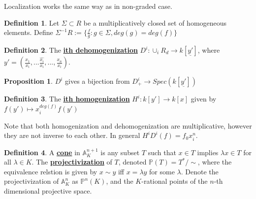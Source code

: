 \documentclass{article}
\theoremstyle{definition}
\theoremstyle{definition}
\newtheorem{definition}{Definition}[theorem]
\theoremstyle{definition}
\theoremstyle{definition}
\newtheorem{proposition}{Proposition}[theorem]
\theoremstyle{definition}
\theoremstyle{definition}
\theoremstyle{definition}
\begin{document}
Localization works the same way as in non-graded case. 

\begin{tcolorbox}[colback=purple!5!white,colframe=purple!75!black]
\begin{definition}
Let $\Sigma\subset R$ be a multiplicatively closed set of homogeneous elements. Define $\Sigma^{-1}R:=\{\frac{f}{g}: g\in \Sigma, deg(g)=deg(f)\}$
\end{definition}
\end{tcolorbox}


\begin{tcolorbox}[colback=purple!5!white,colframe=purple!75!black]
\begin{definition}
The \underline{\textbf{ith dehomogenization}} $D^i: \cup_i R_d\to k[\underline{y'}]$, where $y'=(\frac{x_1}{x_i},...\frac{\hat{x_i}}{x_i},...,\frac{x_n}{x_i})$.
\end{definition}
\end{tcolorbox}


\begin{tcolorbox}[colback=blue!5!white,colframe=blue!30!white]
\begin{proposition}
$D^i$ gives a bijection from $D^i_+ \to Spec(k[\underline{y'}]) $
\end{proposition}
\end{tcolorbox}


\begin{tcolorbox}[colback=purple!5!white,colframe=purple!75!black]
\begin{definition}
The \underline{\textbf{ith homogenization}} $H^i: k[y']\to k[x]$ given by $f(y')\mapsto x_i^{deg(f)}f(y')$
\end{definition}
\end{tcolorbox}

Note that both homogenization and dehomogenization are multiplicative, however they are not inverse to each other. In general $H^iD^i(f)=f_0x_i^n$. 


\begin{tcolorbox}[colback=purple!5!white,colframe=purple!75!black]
\begin{definition}
A \underline{\textbf{cone}} in $\mathbb{A}^{n+1}_K$ is any subset $T$ such that $x\in T$ implies $\lambda x\in T$ for all $\lambda \in K$. The \underline{\textbf{projectivization}} of $T$, denoted $\mathbb{P}(T)=T^*/\sim $, where the equivalence relstion is given by $x\sim y$ iff $x=\lambda y$ for some $\lambda$. Denote the projectivization of $\mathbb{A}^n_K$ as $\mathbb{P}^n(K)$, and the $K$-rational points of the $n$-th dimensional projective space. 
\end{definition}
\end{tcolorbox}
\end{document}

